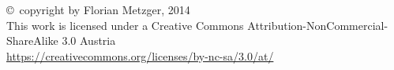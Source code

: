 \newpage
\thispagestyle{empty}
\begin{center}
\copyright~copyright by Florian Metzger, 2014\\
This work is licensed under a Creative Commons Attribution-NonCommercial-ShareAlike 3.0 Austria\\
\url{https://creativecommons.org/licenses/by-nc-sa/3.0/at/}
\vskip 0.5cm
\ccbyncsa
\end{center}
